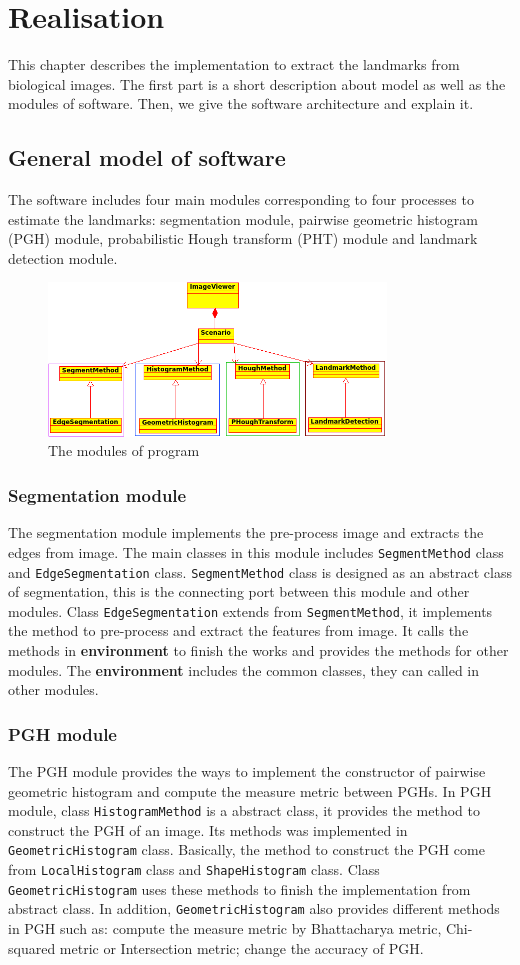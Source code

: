 \chapter{Realisation}
This chapter describes the implementation to extract the landmarks from biological images. The first part is a short description about model as well as the modules of software. Then, we give the software architecture and explain it.
\section{General model of software}
The software includes four main modules corresponding to four processes to estimate the landmarks: segmentation module, pairwise geometric histogram (PGH) module, probabilistic Hough transform (PHT) module and landmark detection module.
\begin{figure}[h!]
\centering
\includegraphics[width=0.8\textwidth]{./images/modules}
\caption{The modules of program}
\label{fig:42}
\end{figure}
\subsection{Segmentation module}
The segmentation module implements the pre-process image and extracts the edges from image. The main classes in this module includes \texttt{SegmentMethod} class and \texttt{EdgeSegmentation} class. \texttt{SegmentMethod} class is designed as an abstract class of segmentation, this is the connecting port between this module and other modules. Class \texttt{EdgeSegmentation} extends from \texttt{SegmentMethod}, it implements the method to pre-process and extract the features from image. It calls the methods in \textbf{environment} to finish the works and provides the methods for other modules. The \textbf{environment} includes the common classes, they can called in other modules.
\subsection{PGH module}
The PGH module provides the ways to implement the constructor of pairwise geometric histogram and compute the measure metric between PGHs. In PGH module, class \texttt{HistogramMethod} is a abstract class, it provides the method to construct the PGH of an image. Its methods was implemented in \texttt{GeometricHistogram} class. Basically, the method to construct the PGH come from \texttt{LocalHistogram} class and \texttt{ShapeHistogram} class. Class \texttt{GeometricHistogram} uses these methods to finish the implementation from abstract class. In addition, \texttt{GeometricHistogram} also provides different methods in PGH such as: compute the measure metric by Bhattacharya metric, Chi-squared metric or Intersection metric; change the accuracy of PGH.
